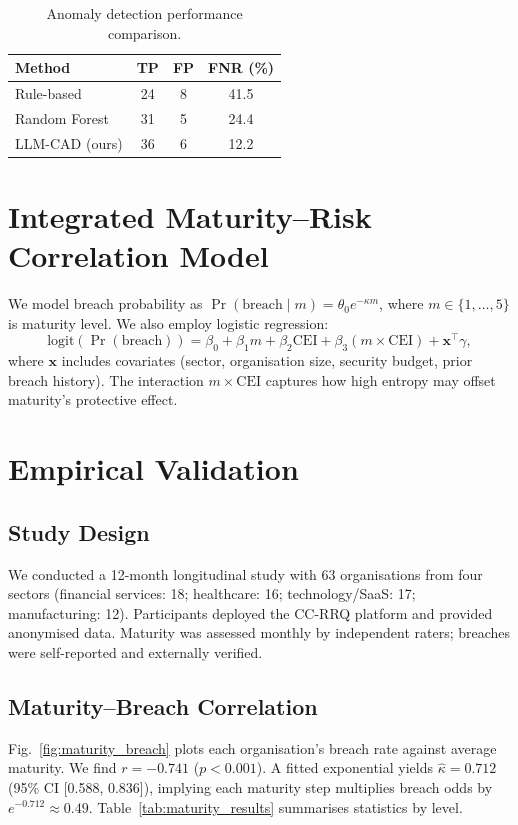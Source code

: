 \documentclass[conference]{IEEEtran}
\newcommand{\CEI}{\mathrm{CEI}}
\newcommand{\bx}{\mathbf{x}}
\newcommand{\logit}{\mathrm{logit}}
\begin{document}
\begin{table}[h]
  \centering
  \caption{Anomaly detection performance comparison.}
  \label{tab:baselines}
  \begin{tabular}{lccc}
    \toprule
    Method & TP & FP & FNR (\%) \\
    \midrule
    Rule-based      & 24 & 8  & 41.5 \\
    Random Forest   & 31 & 5  & 24.4 \\
    LLM-CAD (ours)  & 36 & 6  & 12.2 \\
    \bottomrule
  \end{tabular}
\end{table}

\section{Integrated Maturity--Risk Correlation Model}
\label{sec:maturity}
We model breach probability as $\Pr(\text{breach}\mid m) = \theta_0 e^{-\kappa m}$, where $m\in\{1,\dots,5\}$ is maturity level. We also employ logistic regression:
\begin{equation}
  \logit(\Pr(\text{breach})) = \beta_0 + \beta_1 m + \beta_2 \CEI + \beta_3(m\times \CEI) + \bx^\top \gamma,
  \label{eq:logistic}
\end{equation}
where $\bx$ includes covariates (sector, organisation size, security budget, prior breach history). The interaction $m\times \CEI$ captures how high entropy may offset maturity's protective effect.

\section{Empirical Validation}
\label{sec:experiments}

\subsection{Study Design}
We conducted a 12-month longitudinal study with 63 organisations from four sectors (financial services: 18; healthcare: 16; technology/SaaS: 17; manufacturing: 12). Participants deployed the CC-RRQ platform and provided anonymised data. Maturity was assessed monthly by independent raters; breaches were self-reported and externally verified.

\subsection{Maturity--Breach Correlation}
Fig.~\ref{fig:maturity_breach} plots each organisation's breach rate against average maturity. We find $r=-0.741$ ($p<0.001$). A fitted exponential yields $\hat\kappa=0.712$ (95\% CI [0.588, 0.836]), implying each maturity step multiplies breach odds by $e^{-0.712}\approx0.49$. Table~\ref{tab:maturity_results} summarises statistics by level.
\end{document}
